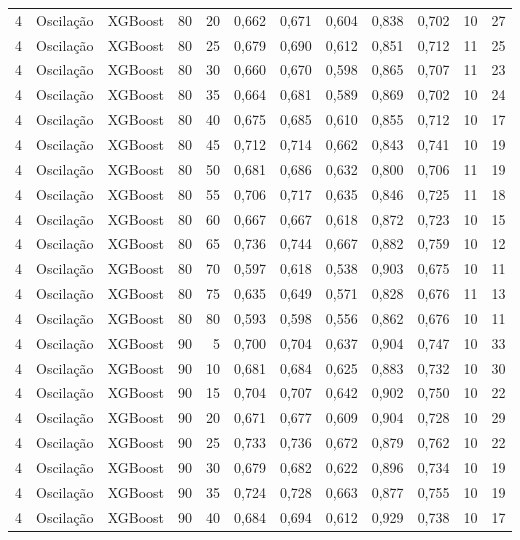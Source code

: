 \begin{longtable}{@{}rllrrrrrrrrr@{}}
4 & Oscilação & XGBoost & 80 & 20 & 0,662 & 0,671 & 0,604 & 0,838 & 0,702 & 10 & 27 \\
4 & Oscilação & XGBoost & 80 & 25 & 0,679 & 0,690 & 0,612 & 0,851 & 0,712 & 11 & 25 \\
4 & Oscilação & XGBoost & 80 & 30 & 0,660 & 0,670 & 0,598 & 0,865 & 0,707 & 11 & 23 \\
4 & Oscilação & XGBoost & 80 & 35 & 0,664 & 0,681 & 0,589 & 0,869 & 0,702 & 10 & 24 \\
4 & Oscilação & XGBoost & 80 & 40 & 0,675 & 0,685 & 0,610 & 0,855 & 0,712 & 10 & 17 \\
4 & Oscilação & XGBoost & 80 & 45 & 0,712 & 0,714 & 0,662 & 0,843 & 0,741 & 10 & 19 \\
4 & Oscilação & XGBoost & 80 & 50 & 0,681 & 0,686 & 0,632 & 0,800 & 0,706 & 11 & 19 \\
4 & Oscilação & XGBoost & 80 & 55 & 0,706 & 0,717 & 0,635 & 0,846 & 0,725 & 11 & 18 \\
4 & Oscilação & XGBoost & 80 & 60 & 0,667 & 0,667 & 0,618 & 0,872 & 0,723 & 10 & 15 \\
4 & Oscilação & XGBoost & 80 & 65 & 0,736 & 0,744 & 0,667 & 0,882 & 0,759 & 10 & 12 \\
4 & Oscilação & XGBoost & 80 & 70 & 0,597 & 0,618 & 0,538 & 0,903 & 0,675 & 10 & 11 \\
4 & Oscilação & XGBoost & 80 & 75 & 0,635 & 0,649 & 0,571 & 0,828 & 0,676 & 11 & 13 \\
4 & Oscilação & XGBoost & 80 & 80 & 0,593 & 0,598 & 0,556 & 0,862 & 0,676 & 10 & 11 \\
4 & Oscilação & XGBoost & 90 & 5 & 0,700 & 0,704 & 0,637 & 0,904 & 0,747 & 10 & 33 \\
4 & Oscilação & XGBoost & 90 & 10 & 0,681 & 0,684 & 0,625 & 0,883 & 0,732 & 10 & 30 \\
4 & Oscilação & XGBoost & 90 & 15 & 0,704 & 0,707 & 0,642 & 0,902 & 0,750 & 10 & 22 \\
4 & Oscilação & XGBoost & 90 & 20 & 0,671 & 0,677 & 0,609 & 0,904 & 0,728 & 10 & 29 \\
4 & Oscilação & XGBoost & 90 & 25 & 0,733 & 0,736 & 0,672 & 0,879 & 0,762 & 10 & 22 \\
4 & Oscilação & XGBoost & 90 & 30 & 0,679 & 0,682 & 0,622 & 0,896 & 0,734 & 10 & 19 \\
4 & Oscilação & XGBoost & 90 & 35 & 0,724 & 0,728 & 0,663 & 0,877 & 0,755 & 10 & 19 \\
4 & Oscilação & XGBoost & 90 & 40 & 0,684 & 0,694 & 0,612 & 0,929 & 0,738 & 10 & 17 \\

\end{longtable}
